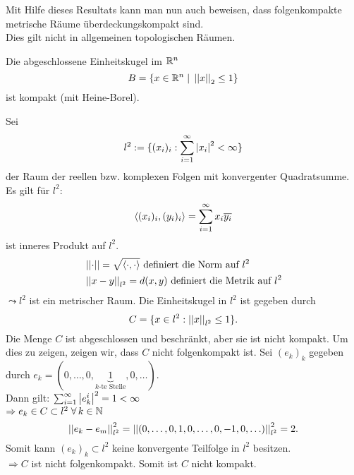 \documentclass[../ana2u.tex]{subfiles}
\begin{document}
    \begin{bem}
        Mit Hilfe dieses Resultats kann man nun auch
        beweisen, dass folgenkompakte metrische Räume
        überdeckungskompakt sind. \\
        Dies gilt nicht in allgemeinen topologischen 
        Räumen.
    \end{bem}
    \begin{bsp}
        Die abgeschlossene Einheitskugel im \( \mathbb{R}^n \)
        \[ B = \{x \in \mathbb{R}^n \;\vert\; 
        \left|\left|x\right|\right|_2 \leq 1\} \]
        ist kompakt (mit Heine-Borel).
    \end{bsp}
    \begin{bsp}
        Sei
        \[ l^2 := \{(x_i)_i: \sum_{i=1}^\infty \left|x_i\right|^2 < \infty\} \]
        der Raum der reellen bzw. komplexen Folgen 
        mit konvergenter Quadratsumme. \\
        Es gilt für \( l^2 \):
        \[ \langle (x_i)_i, (y_i)_i \rangle 
        = \sum_{i=1}^\infty x_i \overline{y_i} \]
        ist inneres Produkt auf \(l^2\).
        \begin{align*}
            & \left|\left|\cdot\right|\right| = \sqrt{\langle \cdot, \cdot \rangle} 
            \text{ definiert die Norm auf } l^2 \\
            & \left|\left|x-y\right|\right|_{l^2} = d(x,y) \text{ definiert die Metrik auf } 
            l^2
        \end{align*}
        \( \leadsto l^2 \) ist ein metrischer Raum.
        Die Einheitskugel in \( l^2 \) ist gegeben 
        durch 
        \[ C = \{x \in l^2: \left|\left|x\right|\right|_{l^2} \leq 1\}. \]
        Die Menge \( C \) ist abgeschlossen und 
        beschränkt, aber sie ist nicht kompakt.
        Um dies zu zeigen, zeigen wir, dass \(C\) nicht 
        folgenkompakt ist.
        Sei \( (e_k)_k \) gegeben durch 
        \( e_k = (0,\dots,0,
        \underbrace{1}_{k\text{-te Stelle}},0,\dots) \). \\
        Dann gilt: 
        \( \sum_{i=1}^\infty \left|e_k^i\right|^2 = 1 < \infty \) \\
        \( \Rightarrow e_k \in C \subset l^2 \; \forall k \in \N \)
        \[ \left|\left|e_k - e_m\right|\right|_{l^2}^2 
        = \left|\left|(0, \ldots, 0, 1, 0, 
        \ldots, 0, -1, 0, \ldots)\right|\right|_{l^2}^2 
        = 2. \]
        Somit kann \( (e_k)_k \subset l^2 \) keine konvergente Teilfolge 
        in \( l^2 \) besitzen. \\
        \( \Rightarrow C \) ist nicht folgenkompakt.
        Somit ist \( C \) nicht kompakt.
    \end{bsp}
    
\end{document}

